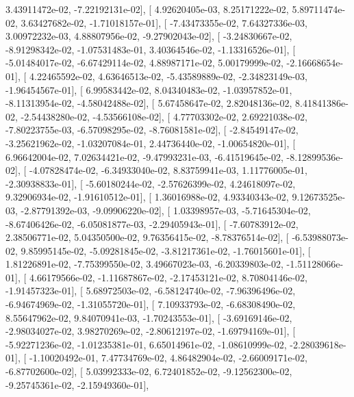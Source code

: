 \documentclass{article}
\begin{document}
          3.43911472e-02,  -7.22192131e-02],
       [  4.92620405e-03,   8.25171222e-02,   5.89711474e-02,
          3.63427682e-02,  -1.71018157e-01],
       [ -7.43473355e-02,   7.64327336e-03,   3.00972232e-03,
          4.88807956e-02,  -9.27902043e-02],
       [ -3.24830667e-02,  -8.91298342e-02,  -1.07531483e-01,
          3.40364546e-02,  -1.13316526e-01],
       [ -5.01484017e-02,  -6.67429114e-02,   4.88987171e-02,
          5.00179999e-02,  -2.16668654e-01],
       [  4.22465592e-02,   4.63646513e-02,  -5.43589889e-02,
         -2.34823149e-03,  -1.96454567e-01],
       [  6.99583442e-02,   8.04340483e-02,  -1.03957852e-01,
         -8.11313954e-02,  -4.58042488e-02],
       [  5.67458647e-02,   2.82048136e-02,   8.41841386e-02,
         -2.54438280e-02,  -4.53566108e-02],
       [  4.77703302e-02,   2.69221038e-02,  -7.80223755e-03,
         -6.57098295e-02,  -8.76081581e-02],
       [ -2.84549147e-02,  -3.25621962e-02,  -1.03207084e-01,
          2.44736440e-02,  -1.00654820e-01],
       [  6.96642004e-02,   7.02634421e-02,  -9.47993231e-03,
         -6.41519645e-02,  -8.12899536e-02],
       [ -4.07828474e-02,  -6.34933040e-02,   8.83759941e-03,
          1.11776005e-01,  -2.30938833e-01],
       [ -5.60180244e-02,  -2.57626399e-02,   4.24618097e-02,
          9.32906934e-02,  -1.91610512e-01],
       [  1.36016988e-02,   4.93340343e-02,   9.12673525e-03,
         -2.87791392e-03,  -9.09906220e-02],
       [  1.03398957e-03,  -5.71645304e-02,  -8.67406426e-02,
         -6.05081877e-03,  -2.29405943e-01],
       [ -7.60783912e-02,   2.38506771e-02,   5.04350500e-02,
          9.76356415e-02,  -8.78376514e-02],
       [ -6.53988073e-02,   9.85995145e-02,  -5.09281845e-02,
         -3.81217361e-02,  -1.76015601e-01],
       [  1.81226891e-02,  -7.75399550e-02,   3.49667023e-03,
         -6.20339803e-02,  -1.51128066e-01],
       [  4.66179566e-02,  -1.11687867e-02,  -2.17453121e-02,
          8.70804146e-02,  -1.91457323e-01],
       [  5.68972503e-02,  -6.58124740e-02,  -7.96396496e-02,
         -6.94674969e-02,  -1.31055720e-01],
       [  7.10933793e-02,  -6.68308490e-02,   8.55647962e-02,
          9.84070941e-03,  -1.70243553e-01],
       [ -3.69169146e-02,  -2.98034027e-02,   3.98270269e-02,
         -2.80612197e-02,  -1.69794169e-01],
       [ -5.92271236e-02,  -1.01235381e-01,   6.65014961e-02,
         -1.08610999e-02,  -2.28039618e-01],
       [ -1.10020492e-01,   7.47734769e-02,   4.86482904e-02,
         -2.66009171e-02,  -6.87702600e-02],
       [  5.03992333e-02,   6.72401852e-02,  -9.12562300e-02,
         -9.25745361e-02,  -2.15949360e-01],
\end{document}
